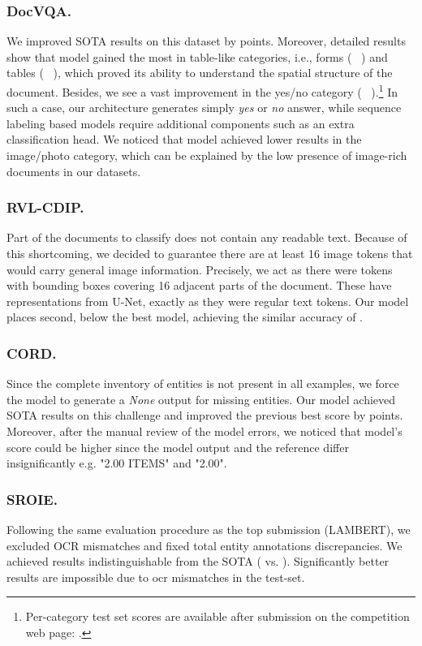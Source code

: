 \documentclass[runningheads]{llncs}
\begin{document}
\subsubsection{DocVQA.}
We improved SOTA results on this dataset by  points. 
Moreover, detailed results show that model gained the most in table-like categories, i.e., forms ( \textrightarrow~) and tables ( \textrightarrow~), which proved its ability to understand the spatial structure of the document.
Besides, we see a vast improvement in the yes/no category ( \textrightarrow~).\footnote{Per-category test set scores are available after submission on the competition web page: .}
In such a case, our architecture generates simply \textit{yes} or \textit{no} answer, while sequence labeling based models require additional components such as an extra classification head.
We noticed that model achieved lower results in the image/photo category, which can be explained by the low presence of image-rich documents in our datasets.

\subsubsection{RVL-CDIP.}
Part of the documents to classify does not contain any readable text.
Because of this shortcoming, we decided to guarantee there are at least 16 image tokens that would carry general image information.
Precisely, we act as there were tokens with bounding boxes covering 16 adjacent parts of the document. These have representations from U-Net, exactly as they were regular text tokens. Our model places second,  below the best model, achieving the similar accuracy of . 



\subsubsection{CORD.}
Since the complete inventory of entities is not present in all examples, we force the model to generate a \textit{None} output for missing entities.
Our model achieved SOTA results on this challenge and improved the previous best score by  points.
Moreover, after the manual review of the model errors, we noticed that model's score could be higher since the model output and the reference differ insignificantly e.g. "2.00 ITEMS" and "2.00".

\subsubsection{SROIE.}
Following the same evaluation procedure as the top submission (LAMBERT), we excluded OCR mismatches and fixed total entity annotations discrepancies. 
We achieved results indistinguishable from the SOTA ( vs. ). Significantly better results are impossible due to ocr mismatches in the test-set.
\end{document}
